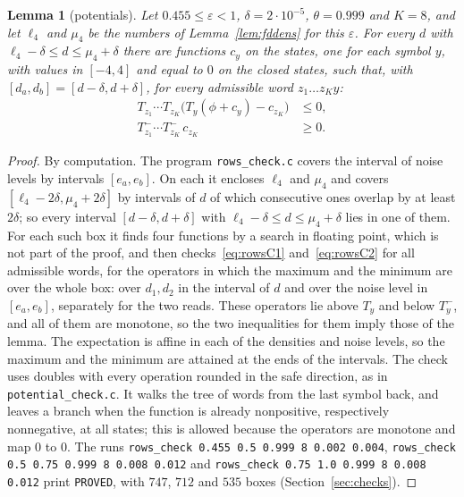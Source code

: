 \documentclass[11pt]{amsart}
\newtheorem{lemma}[theorem]{Lemma}
\theoremstyle{definition}
\theoremstyle{remark}
\newcommand{\eps}{\varepsilon}
\begin{document}
\begin{lemma}[potentials]\label{lem:rowscert}
Let $0.455\le\eps<1$, $\delta=2\cdot10^{-5}$, $\theta=0.999$ and $K=8$, and let $\ell_4$ and
$\mu_4$ be the numbers of Lemma~\ref{lem:fddens} for this $\eps$. For every $d$ with
$\ell_4-\delta\le d\le\mu_4+\delta$ there are functions $c_y$ on the states, one for each symbol
$y$, with values in $[-4,4]$ and equal to $0$ on the closed states, such that, with
$[d_a,d_b]=[d-\delta,d+\delta]$, for every admissible word $z_1\dots z_Ky$:
\begin{align}
T_{z_1}\cdots T_{z_K}\bigl(T_y(\phi+c_y)-c_{z_K}\bigr)&\le0,\label{eq:rowsC1}\\
T^-_{z_1}\cdots T^-_{z_K}\,c_{z_K}&\ge0.\label{eq:rowsC2}
\end{align}
\end{lemma}

\begin{proof}
By computation. The program \texttt{rows\_check.c} covers the interval of noise levels by
intervals $[e_a,e_b]$. On each it encloses $\ell_4$ and $\mu_4$ and covers
$[\ell_4-2\delta,\mu_4+2\delta]$ by intervals of $d$ of which consecutive ones overlap by at
least $2\delta$; so every interval $[d-\delta,d+\delta]$ with $\ell_4-\delta\le d\le\mu_4+\delta$
lies in one of them. For each such box it finds four functions by a search in floating point,
which is not part of the proof, and then checks~\eqref{eq:rowsC1} and~\eqref{eq:rowsC2} for all
admissible words, for the operators in which the maximum and the minimum are over the whole box:
over $d_1,d_2$ in the interval of $d$ and over the noise level in $[e_a,e_b]$, separately for the
two reads. These operators lie above $T_y$ and below $T^-_y$, and all of them are monotone, so the
two inequalities for them imply those of the lemma. The expectation is affine in each of the
densities and noise levels, so the maximum and the minimum are attained at the ends of the
intervals. The check uses doubles with every operation rounded in the safe direction, as in
\texttt{potential\_check.c}. It walks the tree of words from the last symbol back, and leaves a
branch when the function is already nonpositive, respectively nonnegative, at all states; this
is allowed because the operators are monotone and map $0$ to $0$. The runs
\texttt{rows\_check 0.455 0.5 0.999 8 0.002 0.004},
\texttt{rows\_check 0.5 0.75 0.999 8 0.008 0.012} and
\texttt{rows\_check 0.75 1.0 0.999 8 0.008 0.012} print \texttt{PROVED}, with $747$, $712$ and $535$ boxes
(Section~\ref{sec:checks}).
\end{proof}
\end{document}
